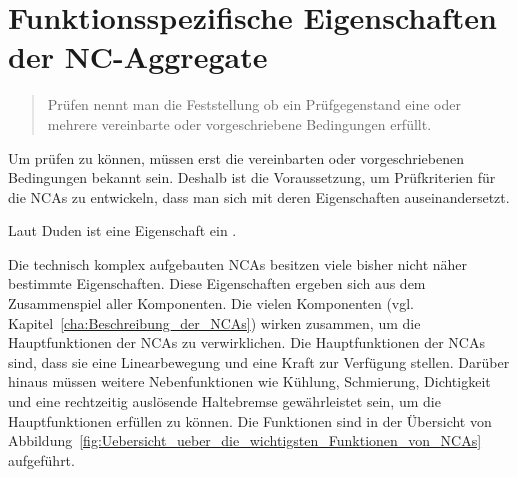 \chapter{Funktionsspezifische Eigenschaften der NC-Aggregate} \label{Eigenschaften_der_Aggregate}



\blockquote{Prüfen nennt man die Feststellung ob ein Prüfgegenstand eine oder mehrere vereinbarte oder vorgeschriebene Bedingungen erfüllt.} \cite{pesch2013messen}




Um prüfen zu können, müssen erst die vereinbarten oder vorgeschriebenen Bedingungen bekannt sein. Deshalb ist die Voraussetzung, um Prüfkriterien für die NCAs zu entwickeln, dass man sich mit deren Eigenschaften auseinandersetzt. 

Laut Duden ist eine Eigenschaft  ein . \cite{Duden_Eigenschaft}


Die technisch komplex aufgebauten NCAs besitzen viele bisher nicht näher bestimmte Eigenschaften. Diese Eigenschaften ergeben sich aus dem Zusammenspiel aller Komponenten.  Die vielen Komponenten (vgl. Kapitel~\ref{cha:Beschreibung_der_NCAs}) wirken zusammen, um die Hauptfunktionen der NCAs zu verwirklichen. Die Hauptfunktionen der NCAs sind, dass sie eine Linearbewegung und eine Kraft zur Verfügung stellen. Darüber hinaus müssen weitere Nebenfunktionen wie Kühlung, Schmierung, Dichtigkeit und eine rechtzeitig auslösende Haltebremse gewährleistet sein, um die Hauptfunktionen erfüllen zu können. Die Funktionen sind in der Übersicht von Abbildung~\ref{fig:Uebersicht_ueber_die_wichtigsten_Funktionen_von_NCAs} aufgeführt.



